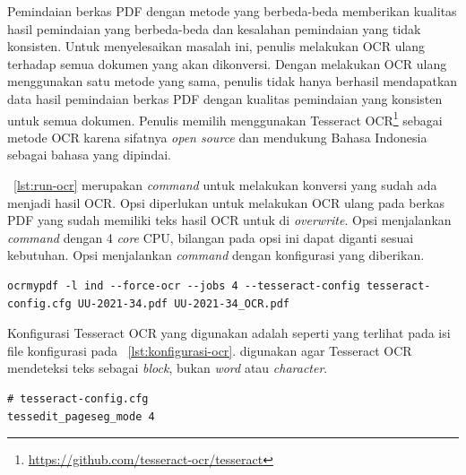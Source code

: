 Pemindaian berkas PDF dengan metode yang berbeda-beda memberikan kualitas hasil pemindaian yang
berbeda-beda dan kesalahan pemindaian yang tidak konsisten. Untuk menyelesaikan masalah ini, penulis
melakukan OCR ulang terhadap semua dokumen yang akan dikonversi. Dengan melakukan OCR ulang
menggunakan satu metode yang sama, penulis tidak hanya berhasil mendapatkan data hasil pemindaian
berkas PDF dengan kualitas pemindaian yang konsisten untuk semua dokumen. Penulis memilih
menggunakan Tesseract OCR\footnote{\url{https://github.com/tesseract-ocr/tesseract}} sebagai metode
OCR karena sifatnya \textit{open source} dan mendukung Bahasa Indonesia sebagai bahasa yang
dipindai.

\lst~\ref{lst:run-ocr} merupakan \textit{command} untuk melakukan konversi 
yang sudah ada menjadi  hasil OCR. Opsi  diperlukan
untuk melakukan OCR ulang pada berkas PDF yang sudah memiliki teks hasil OCR untuk di
\textit{overwrite}. Opsi  menjalankan \textit{command} dengan 4 \textit{core} CPU,
bilangan pada opsi ini dapat diganti sesuai kebutuhan. Opsi  menjalankan \textit{command} dengan konfigurasi yang diberikan.

\begin{listing}[H]
  \begin{verbatim}
ocrmypdf -l ind --force-ocr --jobs 4 --tesseract-config tesseract-config.cfg UU-2021-34.pdf UU-2021-34_OCR.pdf
  \end{verbatim}
  \caption{Command untuk menjalankan OCR}
  \label{lst:run-ocr}
\end{listing}

Konfigurasi Tesseract OCR yang digunakan adalah  seperti yang
terlihat pada isi file konfigurasi pada \lst~\ref{lst:konfigurasi-ocr}.  digunakan agar
Tesseract OCR mendeteksi teks sebagai \textit{block}, bukan \textit{word} atau \textit{character}.

\begin{listing}[H]
  \begin{verbatim}
# tesseract-config.cfg
tessedit_pageseg_mode 4
  \end{verbatim}
  \caption{Konfigurasi Tesseract OCR}
  \label{lst:konfigurasi-ocr}
\end{listing}

